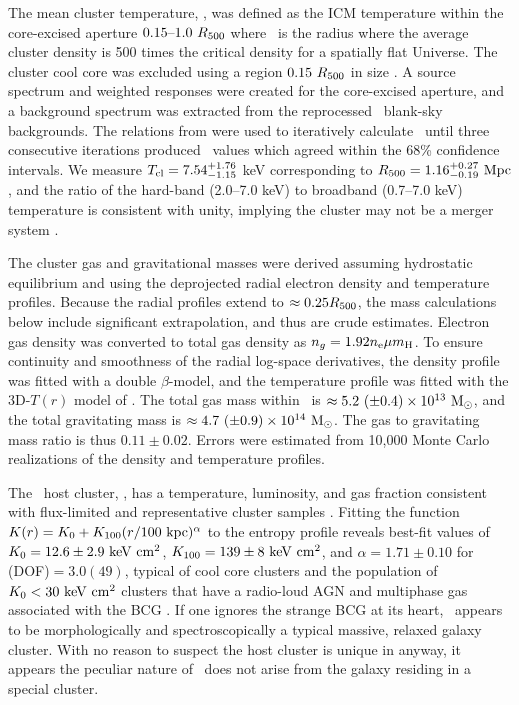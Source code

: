 \documentclass[useAMS,usenatbib]{mn2e}
\begin{document}
The mean cluster temperature, \cltx, was defined as the ICM
temperature within the core-excised aperture $0.15 \mbox{--} 1.0~R_{\rm{500}}$
where \rf\ is the radius where the average cluster density is 500
times the critical density for a spatially flat Universe. The cluster
cool core was excluded using a region $0.15 ~R_{\rm{500}}$ in size
\citep{2007ApJ...668..772M}. A source spectrum and weighted responses
were created for the core-excised aperture, and a background spectrum
was extracted from the reprocessed \caldb\ blank-sky backgrounds. The
relations from \cite{2002A&A...389....1A} were used to iteratively
calculate \rf\ until three consecutive iterations produced
\cltx\ values which agreed within the 68\% confidence intervals. We
measure $T_{\rm{cl}} = 7.54^{+1.76}_{-1.15}$ keV corresponding to $R_{\rm{500}} =
1.16^{+0.27}_{-0.19}~\mbox{\ensuremath{\rm{Mpc}}}$, and the ratio of the hard-band (2.0--7.0
keV) to broadband (0.7--7.0 keV) temperature is consistent with unity,
implying the cluster may not be a merger system
\citep[\eg][]{xrayband}.

The cluster gas and gravitational masses were derived assuming
hydrostatic equilibrium and using the deprojected radial electron
density and temperature profiles. Because the radial profiles extend
to $\approx 0.25 R_{\rm{500}}$, the mass calculations below include significant
extrapolation, and thus are crude estimates. Electron gas density was
converted to total gas density as $n_g = 1.92 n_{\rm{e}} \mu m_{\rm{H}}$. To
ensure continuity and smoothness of the radial log-space derivatives,
the density profile was fitted with a double $\beta$-model, and the
temperature profile was fitted with the 3D-$T(r)$ model of
\citet{2006ApJ...640..691V}. The total gas mass within \rf\ is
$\approx 5.2 ~(\pm 0.4) \times 10^{13} ~\rm{M_{\odot}}$, and the total
gravitating mass is $\approx 4.7 ~(\pm 0.9) \times 10^{14}
~\rm{M_{\odot}}$. The gas to gravitating mass ratio is thus $0.11 \pm
0.02$. Errors were estimated from 10,000 Monte Carlo realizations of
the density and temperature profiles.

The \irs\ host cluster, \rxj, has a temperature, luminosity, and gas
fraction consistent with flux-limited and representative cluster
samples \citep{hiflugcs2, 2009A&A...498..361P}. Fitting the function
$K(r) = K_0 +K_{100} (r/100 ~\mbox{\ensuremath{\rm{kpc}}})^{\alpha}$ to the entropy profile
reveals best-fit values of $K_0 = 12.6 \pm 2.9 ~\rm{\mbox{\ensuremath{\rm{keV}}}~\ensuremath{\rm{\mbox{\ensuremath{\rm{cm}}}^2}}}$, $K_{100} = 139
\pm 8 ~\rm{\mbox{\ensuremath{\rm{keV}}}~\ensuremath{\rm{\mbox{\ensuremath{\rm{cm}}}^2}}}$, and $\alpha = 1.71 \pm 0.10$ for \chisq(DOF)$ =
3.0(49)$, typical of cool core clusters and the population of $K_0 <
30 ~\rm{\mbox{\ensuremath{\rm{keV}}}~\ensuremath{\rm{\mbox{\ensuremath{\rm{cm}}}^2}}}$ clusters that have a radio-loud AGN and multiphase gas
associated with the BCG \citep{haradent, rafferty08, accept,
  2009MNRAS.395..764S}. If one ignores the strange BCG at its heart,
\rxj\ appears to be morphologically and spectroscopically a typical
massive, relaxed galaxy cluster. With no reason to suspect the host
cluster is unique in anyway, it appears the peculiar nature of
\irs\ does not arise from the galaxy residing in a special cluster.
\end{document}
